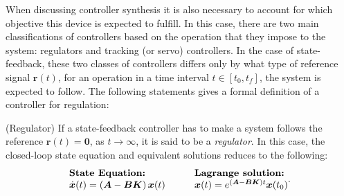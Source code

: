 \documentclass[a4paper,11pt]{book}
\numberwithin{figure}{chapter}
\numberwithin{equation}{chapter}
\numberwithin{table}{chapter}
\theoremstyle{definition}
\newtheorem{definition}{Definition}[chapter]
\newcounter{boxed-theorem}
\newcounter{boxed-definition}
\newenvironment{boxed-definition}[1]
{\begin{shaded} \begin{definition}{#1}}
{\end{definition} \end{shaded}}
\begin{document}
When discussing controller synthesis it is also necessary to account for which objective this device is expected to fulfill. In this case, there are two main classifications of controllers based on the operation that they impose to the system: regulators and tracking (or servo) controllers. In the case of state-feedback, these two classes of controllers differs only by what type of reference signal $\bm{r}(t)$, for an operation in a time interval $t \in [t_0, t_f]$, the system is expected to follow. The following statements gives a formal definition of a controller for regulation:

\begin{boxed-definition}{(Regulator)} \label{def:regulator}
    If a state-feedback controller has to make a system follows the reference $\bm{r}(t) = \bm{0}$, as $t \to \infty$, it is said to be a \textit{regulator}. In this case, the closed-loop state equation and equivalent solutions reduces to the following:
        \begin{align}
    \begin{matrix*}[l]
    \textbf{State Equation:} \hfill & & & \textbf{Lagrange solution:} \hfill \\
    \dot{\bm{x}}(t) = \left( \bm{A} - \bm{B} \bm{K} \right) \bm{x}(t)  & & &
    \bm{x}(t) = e^{(\bm{A} - \bm{B} \bm{K}) t} \bm{x}(t_0) \hfill
    \end{matrix*}
    .\end{align}
\end{boxed-definition}
\end{document}
